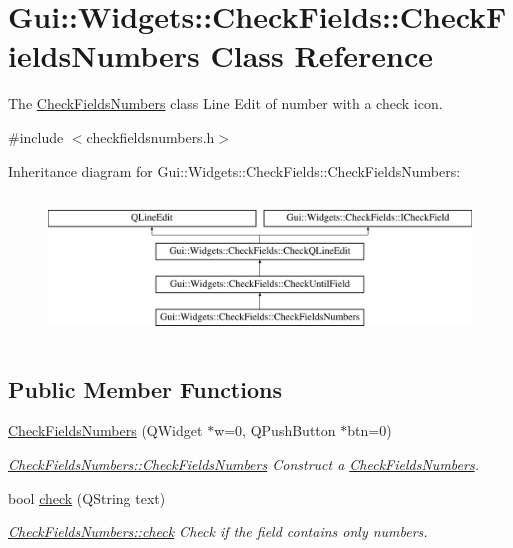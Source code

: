 \hypertarget{classGui_1_1Widgets_1_1CheckFields_1_1CheckFieldsNumbers}{\section{Gui\-:\-:Widgets\-:\-:Check\-Fields\-:\-:Check\-Fields\-Numbers Class Reference}
\label{classGui_1_1Widgets_1_1CheckFields_1_1CheckFieldsNumbers}
}


The \hyperlink{classGui_1_1Widgets_1_1CheckFields_1_1CheckFieldsNumbers}{Check\-Fields\-Numbers} class Line Edit of number with a check icon.  




{\ttfamily \#include $<$checkfieldsnumbers.\-h$>$}

Inheritance diagram for Gui\-:\-:Widgets\-:\-:Check\-Fields\-:\-:Check\-Fields\-Numbers\-:\begin{figure}[H]
\begin{center}
\leavevmode
\includegraphics[height=3.848797cm]{d9/daa/classGui_1_1Widgets_1_1CheckFields_1_1CheckFieldsNumbers}
\end{center}
\end{figure}
\subsection*{Public Member Functions}
\begin{DoxyCompactItemize}
\item 
\hyperlink{classGui_1_1Widgets_1_1CheckFields_1_1CheckFieldsNumbers_ab0af4f695b33792c28ce37cf27aea6cf}{Check\-Fields\-Numbers} (Q\-Widget $\ast$w=0, Q\-Push\-Button $\ast$btn=0)
\begin{DoxyCompactList}\small\item\em \hyperlink{classGui_1_1Widgets_1_1CheckFields_1_1CheckFieldsNumbers_ab0af4f695b33792c28ce37cf27aea6cf}{Check\-Fields\-Numbers\-::\-Check\-Fields\-Numbers} Construct a \hyperlink{classGui_1_1Widgets_1_1CheckFields_1_1CheckFieldsNumbers}{Check\-Fields\-Numbers}. \end{DoxyCompactList}\item 
bool \hyperlink{classGui_1_1Widgets_1_1CheckFields_1_1CheckFieldsNumbers_ade88f674fc2cbbeb514cdf81c0f63487}{check} (Q\-String text)
\begin{DoxyCompactList}\small\item\em \hyperlink{classGui_1_1Widgets_1_1CheckFields_1_1CheckFieldsNumbers_ade88f674fc2cbbeb514cdf81c0f63487}{Check\-Fields\-Numbers\-::check} Check if the field contains only numbers. \end{DoxyCompactList}\end{DoxyCompactItemize}
